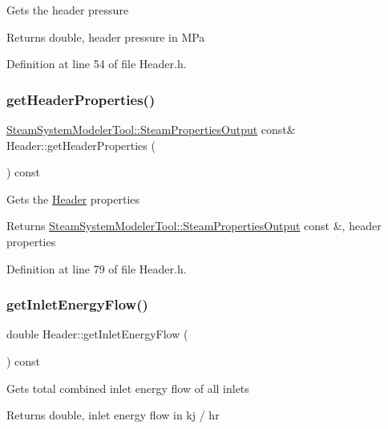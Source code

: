Gets the header pressure \begin{DoxyReturn}{Returns}
double, header pressure in M\+Pa 
\end{DoxyReturn}


Definition at line 54 of file Header.\+h.

\mbox{\label{class_header_a0d27b0e1b3c16cc24b4ba6f64abb7cb0}} 
\subsubsection{\texorpdfstring{get\+Header\+Properties()}{getHeaderProperties()}}
{\footnotesize\ttfamily \hyperlink{struct_steam_system_modeler_tool_1_1_steam_properties_output}{Steam\+System\+Modeler\+Tool\+::\+Steam\+Properties\+Output} const\& Header\+::get\+Header\+Properties (\begin{DoxyParamCaption}{ }\end{DoxyParamCaption}) const\hspace{0.3cm}{\ttfamily [inline]}}

Gets the \hyperlink{class_header}{Header} properties \begin{DoxyReturn}{Returns}
\hyperlink{struct_steam_system_modeler_tool_1_1_steam_properties_output}{Steam\+System\+Modeler\+Tool\+::\+Steam\+Properties\+Output} const \&, header properties 
\end{DoxyReturn}


Definition at line 79 of file Header.\+h.

\mbox{\label{class_header_a2a30ee96fa76bab1533cb9ceea0c8af3}} 
\subsubsection{\texorpdfstring{get\+Inlet\+Energy\+Flow()}{getInletEnergyFlow()}}
{\footnotesize\ttfamily double Header\+::get\+Inlet\+Energy\+Flow (\begin{DoxyParamCaption}{ }\end{DoxyParamCaption}) const\hspace{0.3cm}{\ttfamily [inline]}}

Gets total combined inlet energy flow of all inlets \begin{DoxyReturn}{Returns}
double, inlet energy flow in kj / hr 
\end{DoxyReturn}


